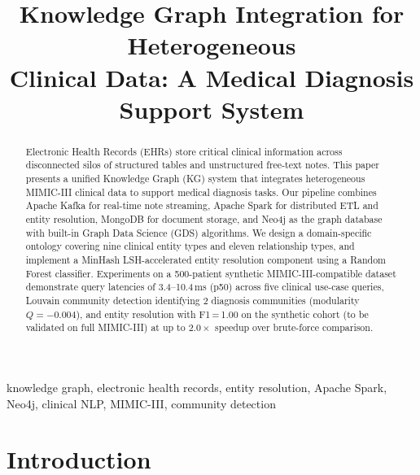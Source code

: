 \documentclass[conference]{IEEEtran}
\begin{document}
\title{Knowledge Graph Integration for Heterogeneous\\
Clinical Data: A Medical Diagnosis Support System}

\author{
}

\maketitle

\begin{abstract}
Electronic Health Records (EHRs) store critical clinical information across
disconnected silos of structured tables and unstructured free-text notes.
This paper presents a unified Knowledge Graph (KG) system that integrates
heterogeneous MIMIC-III clinical data to support medical diagnosis tasks.
Our pipeline combines Apache Kafka for real-time note streaming, Apache Spark
for distributed ETL and entity resolution, MongoDB for document storage, and
Neo4j as the graph database with built-in Graph Data Science (GDS) algorithms.
We design a domain-specific ontology covering nine clinical entity types and
eleven relationship types, and implement a MinHash LSH-accelerated entity
resolution component using a Random Forest classifier.
Experiments on a 500-patient synthetic MIMIC-III-compatible dataset
demonstrate query latencies of 3.4--10.4\,ms (p50) across five clinical
use-case queries, Louvain community detection identifying 2 diagnosis
communities (modularity $Q=-0.004$), and entity resolution with
F1\,=\,1.00 on the synthetic cohort (to be validated on full MIMIC-III)
at up to $2.0\times$ speedup over brute-force comparison.
\end{abstract}

\begin{IEEEkeywords}
knowledge graph, electronic health records, entity resolution, Apache Spark,
Neo4j, clinical NLP, MIMIC-III, community detection
\end{IEEEkeywords}

\section{Introduction}
\end{document}
